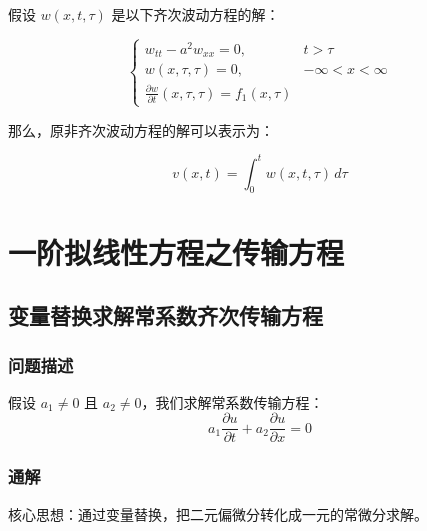 \documentclass[12pt,a4paper]{article}
\numberwithin{subsection}{section}   %
\numberwithin{subsubsection}{subsection}
\theoremstyle{plain}
\theoremstyle{definition}
\theoremstyle{remark}
\theoremstyle{remark}
\begin{document}
	假设 \(w(x, t, \tau)\) 是以下齐次波动方程的解：
	
\begin{equation}
	\begin{cases}
		w_{tt} - a^2 w_{xx} = 0, & t > \tau \\
		w(x, \tau, \tau) = 0, & -\infty < x < \infty \\
		\frac{\partial w}{\partial t}(x, \tau, \tau) = f_1(x, \tau)
	\end{cases}
\end{equation}
	
	那么，原非齐次波动方程的解可以表示为：
	
\begin{equation}
	v(x, t) = \int_0^t w(x, t, \tau) \, d\tau
\end{equation}
	

	
	
	
	
	
	\newpage
	\section{一阶拟线性方程之传输方程} 
	\subsection{变量替换求解常系数齐次传输方程} 
	\subsubsection{问题描述}
	
	
	假设 $a_1 \neq 0$ 且 $a_2 \neq 0$，我们求解常系数传输方程：
	\begin{equation} \label{eq:pde_original}
		a_1 \frac{\partial u}{\partial t} + a_2 \frac{\partial u}{\partial x} = 0
	\end{equation}
	
	\subsubsection{通解} 
	核心思想：通过变量替换，把二元偏微分转化成一元的常微分求解。
	
\end{document}
